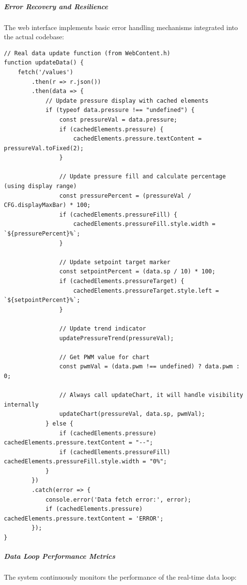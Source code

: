 \subparagraph{Error Recovery and Resilience}
The web interface implements basic error handling mechanisms integrated into the actual codebase:

\begin{lstlisting}[caption=Actual JavaScript Implementation - Real-time Data Loop]
// Real data update function (from WebContent.h)
function updateData() {
    fetch('/values')
        .then(r => r.json())
        .then(data => {
            // Update pressure display with cached elements
            if (typeof data.pressure !== "undefined") {
                const pressureVal = data.pressure;
                if (cachedElements.pressure) {
                    cachedElements.pressure.textContent = pressureVal.toFixed(2);
                }
                
                // Update pressure fill and calculate percentage (using display range)
                const pressurePercent = (pressureVal / CFG.displayMaxBar) * 100;
                if (cachedElements.pressureFill) {
                    cachedElements.pressureFill.style.width = `${pressurePercent}%`;
                }
                
                // Update setpoint target marker
                const setpointPercent = (data.sp / 10) * 100;
                if (cachedElements.pressureTarget) {
                    cachedElements.pressureTarget.style.left = `${setpointPercent}%`;
                }
                
                // Update trend indicator
                updatePressureTrend(pressureVal);
                
                // Get PWM value for chart
                const pwmVal = (data.pwm !== undefined) ? data.pwm : 0;
                
                // Always call updateChart, it will handle visibility internally
                updateChart(pressureVal, data.sp, pwmVal);
            } else {
                if (cachedElements.pressure) cachedElements.pressure.textContent = "--";
                if (cachedElements.pressureFill) cachedElements.pressureFill.style.width = "0%";
            }
        })
        .catch(error => {
            console.error('Data fetch error:', error);
            if (cachedElements.pressure) cachedElements.pressure.textContent = 'ERROR';
        });
}
\end{lstlisting}

\subparagraph{Data Loop Performance Metrics}
The system continuously monitors the performance of the real-time data loop:

